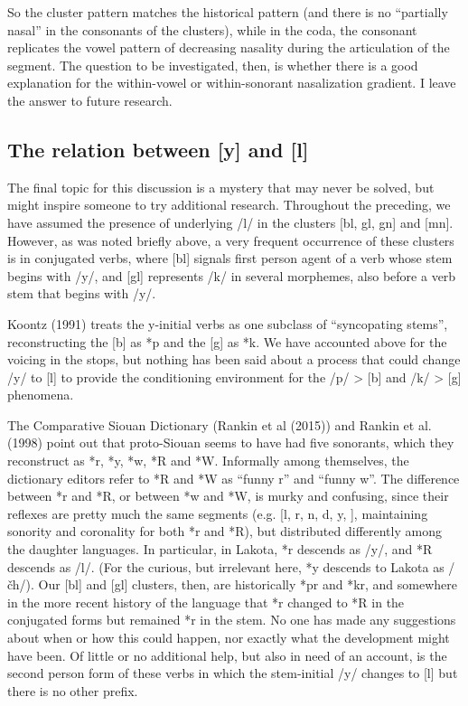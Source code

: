 \documentclass[output=paper]{LSP/langsci}
\begin{document}
So the cluster pattern matches the historical pattern (and there is no ``partially nasal'' in the consonants of the clusters), while in the coda, the consonant replicates the vowel pattern of decreasing nasality during the articulation of the segment. The question to be investigated, then, is whether there is a good explanation for the within-vowel or within-sonorant nasalization gradient. I leave the answer to future research.

\subsection{The relation between [y] and [l]}

The final topic for this discussion is a mystery that may never be solved, but might inspire someone to try additional research. Throughout the preceding, we have assumed the presence of underlying /l/ in the clusters [bl, gl, gn] and [mn]. However, as was noted briefly above, a very frequent occurrence of these clusters is in conjugated verbs, where [bl] signals first person agent of a verb whose stem begins with /y/, and [gl] represents /k/ in several morphemes, also before a verb stem that begins with /y/.

Koontz (1991) treats the y-initial verbs as one subclass of ``syncopating stems'', reconstructing the [b] as *p and the [g] as *k. We have accounted above for the voicing in the stops, but nothing has been said about a process that could change /y/ to [l] to provide the conditioning environment for the /p/ > [b] and /k/ > [g] phenomena.

The Comparative Siouan Dictionary (Rankin et al  (2015)) and Rankin et al. (1998) point out that proto-Siouan seems to have had five sonorants, which they reconstruct as *r, *y, *w, *R and *W. Informally among themselves, the dictionary editors refer to *R and *W as ``funny r'' and ``funny w''. The difference between *r and *R, or between *w and *W, is murky and confusing, since their reflexes are pretty much the same segments (e.g. [l, r, n, d, y, ], maintaining sonority and coronality for both *r and *R), but distributed differently among the daughter languages. In particular, in Lakota, *r descends as /y/, and *R descends as /l/. (For the curious, but irrelevant here, *y descends to Lakota as /\v{c}h/). Our [bl] and [gl] clusters, then, are historically *pr and *kr, and somewhere in the more recent history of the language that *r changed to *R in the conjugated forms but remained *r in the stem. No one has made any suggestions about when or how this could happen, nor exactly what the development might have been. Of little or no additional help, but also in need of an account, is the second person form of these verbs in which the stem-initial /y/ changes to [l] but there is no other prefix.
\end{document}
